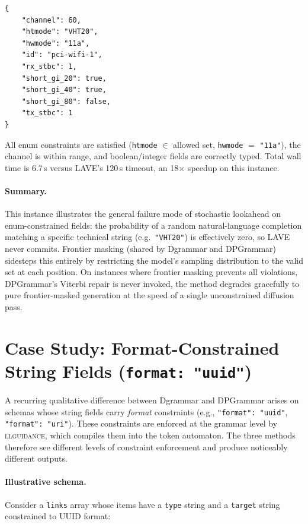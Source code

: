\begin{lstlisting}[style=appendixcode]
{
    "channel": 60,
    "htmode": "VHT20",
    "hwmode": "11a",
    "id": "pci-wifi-1",
    "rx_stbc": 1,
    "short_gi_20": true,
    "short_gi_40": true,
    "short_gi_80": false,
    "tx_stbc": 1
}
\end{lstlisting}

All enum constraints are satisfied (\texttt{htmode} $\in$ allowed set, \texttt{hwmode} $=$ \texttt{"11a"}), the channel is within range, and boolean/integer fields are correctly typed.
Total wall time is 6.7\,s versus LAVE's 120\,s timeout, an 18$\times$ speedup on this instance.

\paragraph{Summary.}
This instance illustrates the general failure mode of stochastic lookahead on enum-constrained fields: the probability of a random natural-language completion matching a specific technical string (e.g.\ \texttt{"VHT20"}) is effectively zero, so LAVE never commits.
Frontier masking (shared by Dgrammar and DPGrammar) sidesteps this entirely by restricting the model's sampling distribution to the valid set at each position.
On instances where frontier masking prevents all violations, DPGrammar's Viterbi repair is never invoked, the method degrades gracefully to pure frontier-masked generation at the speed of a single unconstrained diffusion pass.

\section{Case Study: Format-Constrained String Fields (\texttt{format: "uuid"})}
\label{app:format}

A recurring qualitative difference between Dgrammar and DPGrammar arises on schemas whose string fields carry \emph{format} constraints (e.g., \texttt{"format": "uuid"}, \texttt{"format": "uri"}).
These constraints are enforced at the grammar level by \textsc{llguidance}, which compiles them into the token automaton.
The three methods therefore see different levels of constraint enforcement and produce noticeably different outputs.

\paragraph{Illustrative schema.}
Consider a \texttt{links} array whose items have a \texttt{type} string and a \texttt{target} string constrained to UUID format:

